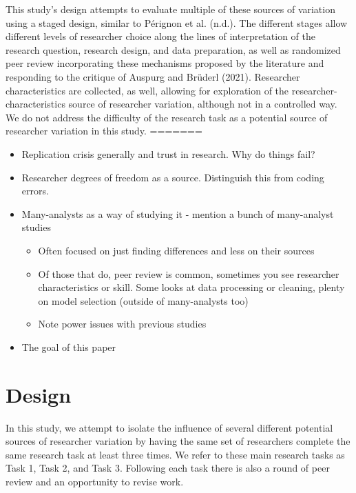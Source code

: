 \documentclass[
  letterpaper,
  DIV=11,
  numbers=noendperiod]{scrartcl}
\begin{document}
This study's design attempts to evaluate multiple of these sources of
variation using a staged design, similar to Pérignon et al. (n.d.). The
different stages allow different levels of researcher choice along the
lines of interpretation of the research question, research design, and
data preparation, as well as randomized peer review incorporating these
mechanisms proposed by the literature and responding to the critique of
Auspurg and Brüderl (2021). Researcher characteristics are collected, as
well, allowing for exploration of the researcher-characteristics source
of researcher variation, although not in a controlled way. We do not
address the difficulty of the research task as a potential source of
researcher variation in this study.
=======
\begin{itemize}
\item
  Replication crisis generally and trust in research. Why do things
  fail?
\item
  Researcher degrees of freedom as a source. Distinguish this from
  coding errors.
\item
  Many-analysts as a way of studying it - mention a bunch of
  many-analyst studies

  \begin{itemize}
  \item
    Often focused on just finding differences and less on their sources
  \item
    Of those that do, peer review is common, sometimes you see
    researcher characteristics or skill. Some looks at data processing
    or cleaning, plenty on model selection (outside of many-analysts
    too)
  \item
    Note power issues with previous studies
  \end{itemize}
\item
  The goal of this paper
\end{itemize}

\hypertarget{design}{%
\section{Design}\label{design}}

In this study, we attempt to isolate the influence of several different
potential sources of researcher variation by having the same set of
researchers complete the same research task at least three times. We
refer to these main research tasks as Task 1, Task 2, and Task 3.
Following each task there is also a round of peer review and an
opportunity to revise work.
\end{document}
